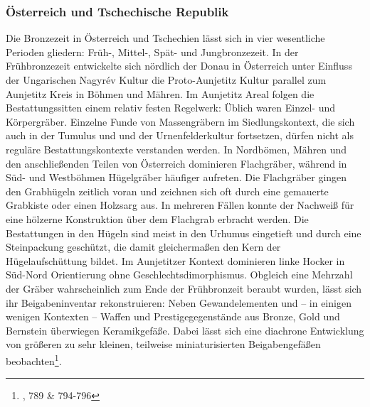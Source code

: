 \documentclass[openany,twoside,twocolumn]{book}
\let\rmarkdownfootnote\footnote%
\def\footnote{\protect\rmarkdownfootnote}
\begin{document}
\hypertarget{osterreich-und-tschechische-republik}{%
\subsubsection{Österreich und Tschechische
Republik}\label{osterreich-und-tschechische-republik}}

Die Bronzezeit in Österreich und Tschechien lässt sich in vier
wesentliche Perioden gliedern: Früh-, Mittel-, Spät- und Jungbronzezeit.
In der Frühbronzezeit entwickelte sich nördlich der Donau in Österreich
unter Einfluss der Ungarischen Nagyrév Kultur die Proto-Aunjetitz Kultur
parallel zum Aunjetitz Kreis in Böhmen und Mähren. Im Aunjetitz Areal
folgen die Bestattungssitten einem relativ festen Regelwerk: Üblich
waren Einzel- und Körpergräber. Einzelne Funde von Massengräbern im
Siedlungskontext, die sich auch in der Tumulus und und der
Urnenfelderkultur fortsetzen, dürfen nicht als reguläre
Bestattungskontexte verstanden werden. In Nordbömen, Mähren und den
anschließenden Teilen von Österreich dominieren Flachgräber, während in
Süd- und Westböhmen Hügelgräber häufiger aufreten. Die Flachgräber
gingen den Grabhügeln zeitlich voran und zeichnen sich oft durch eine
gemauerte Grabkiste oder einen Holzsarg aus. In mehreren Fällen konnte
der Nachweiß für eine hölzerne Konstruktion über dem Flachgrab erbracht
werden. Die Bestattungen in den Hügeln sind meist in den Urhumus
eingetieft und durch eine Steinpackung geschützt, die damit
gleichermaßen den Kern der Hügelaufschüttung bildet. Im Aunjetitzer
Kontext dominieren linke Hocker in Süd-Nord Orientierung ohne
Geschlechtsdimorphismus. Obgleich eine Mehrzahl der Gräber
wahrscheinlich zum Ende der Frühbronzeit beraubt wurden, lässt sich ihr
Beigabeninventar rekonstruieren: Neben Gewandelementen und -- in einigen
wenigen Kontexten -- Waffen und Prestigegegenstände aus Bronze, Gold und
Bernstein überwiegen Keramikgefäße. Dabei lässt sich eine diachrone
Entwicklung von größeren zu sehr kleinen, teilweise miniaturisierten
Beigabengefäßen beobachten\footnote{\textcite{lubos_czech_2013}, 789 \&
  794-796}.
\end{document}
